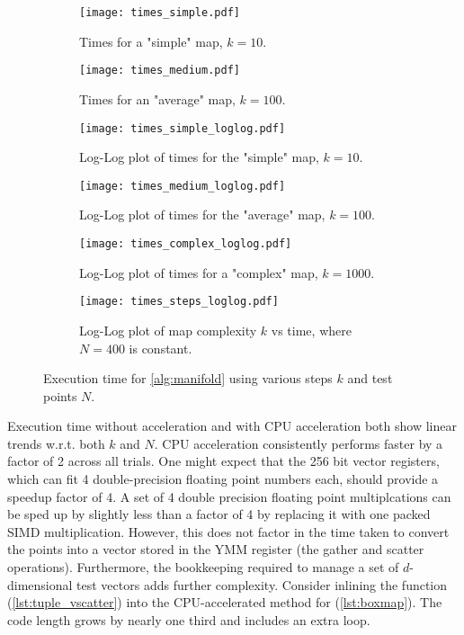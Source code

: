 \begin{figure}
    \centering
    \begin{subfigure}[t]{0.45\textwidth}
        \texttt{[image: times\_simple.pdf]}
        \caption{Times for a "simple" map, $k = 10$.}
        \label{fig:times:simple}
    \end{subfigure}
    \hfill
    \begin{subfigure}[t]{0.45\textwidth}
        \texttt{[image: times\_medium.pdf]}
        \caption{Times for an "average" map, $k = 100$.}
        \label{fig:times:med}
    \end{subfigure}
    \medskip
    \begin{subfigure}[t]{0.45\textwidth}
        \texttt{[image: times\_simple\_loglog.pdf]}
        \caption{Log-Log plot of times for the "simple" map, $k = 10$.}
        \label{fig:times:simple:loglog}
    \end{subfigure}
    \hfill
    \begin{subfigure}[t]{0.45\textwidth}
        \texttt{[image: times\_medium\_loglog.pdf]}
        \caption{Log-Log plot of times for the "average" map, $k = 100$.}
        \label{fig:times:med:loglog}
    \end{subfigure}
    \medskip
    \begin{subfigure}[t]{0.45\textwidth}
        \texttt{[image: times\_complex\_loglog.pdf]}
        \caption{Log-Log plot of times for a "complex" map, $k = 1000$.}
        \label{fig:times:complex:loglog}
    \end{subfigure}
    \hfill
    \begin{subfigure}[t]{0.45\textwidth}
        \texttt{[image: times\_steps\_loglog.pdf]}
        \caption{Log-Log plot of map complexity $k$ vs time, where $N = 400$ is constant.}
        \label{fig:times:steps:loglog}
    \end{subfigure}
    \caption{
        Execution time for \autoref{alg:manifold} using various steps $k$ and test points $N$. 
    }
    \label{fig:times}
\end{figure}

Execution time without acceleration and with CPU acceleration both show linear trends 
w.r.t. both $k$ and $N$. CPU acceleration consistently performs faster by a factor of 2 
across all trials. One might expect that the 256 bit vector registers, which can fit 4 
double-precision floating point numbers each, should provide a speedup factor of 4. 
A set of 4 double precision floating point multiplcations can be sped up by slightly less 
than a factor of 4 by replacing it with one packed SIMD multiplication. However, this does 
not factor in the time taken to convert the points into a vector stored in the YMM 
register (the gather and scatter operations). Furthermore, the bookkeeping required to 
manage a set of $d$-dimensional test vectors adds further complexity. Consider inlining 
the function  (\autoref{lst:tuple_vscatter}) into the 
CPU-accelerated method for  (\autoref{lst:boxmap}). The code length grows 
by nearly one third and includes an extra  loop. \\

